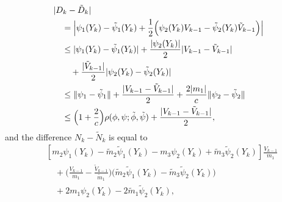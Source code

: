\documentclass[journal]{IEEEtran}
\newcommand{\1}{\boldsymbol{1}}
\begin{document}
  \begin{align*}
    \notag
	&|D_k - \tilde{D}_k|\\%
	&\quad= \Big| \psi_1(Y_k) - \tilde{\psi}_1(Y_k) + \frac{1}{2}\Big(\psi_2(Y_k)V_{k-1} - \tilde{\psi}_2(Y_k)\tilde{V}_{k-1} \Big) \Big|\\
	\notag
	&\quad\leq |\psi_1(Y_k) - \tilde{\psi}_1(Y_k)|%
          + \frac{|\psi_2(Y_k)|}{2}|V_{k-1} - \tilde{V}_{k-1}|\\%
    &\qquad
   + \frac{|\tilde{V}_{k-1}|}{2}|\psi_2(Y_k) - \tilde{\psi}_2(Y_k)|\\
   \notag
	&\quad\leq \|\psi_1 - \tilde{\psi}_1\| + \frac{|V_{k-1} - \tilde{V}_{k-1}|}{2}%
   + \frac{2|m_1|}{c}\|\psi_2 - \tilde{\psi}_2\|\\
	&\quad\leq \Big(1 + \frac{2}{c}\Big)\rho(\phi,\psi;\tilde{\phi},\tilde{\psi})%
   + \frac{|V_{k-1} - \tilde{V}_{k-1}|}{2},
  \end{align*}
  and the difference $N_k - \tilde{N}_k $ is equal to
  \begin{align*}
	& [m_2\psi_1(Y_k) - \tilde{m}_2\tilde{\psi}_1(Y_k) - m_3\psi_2(Y_k) + \tilde{m}_3\tilde{\psi}_2(Y_k)] \frac{V_{k-1}}{m_1}\\
	&\quad%
          + \Big(\frac{V_{k-1}}{m_1} - \frac{\tilde{V}_{k-1}}{\tilde{m}_1} \Big)\Big(\tilde{m}_2\tilde{\psi}_1(Y_k) - \tilde{m}_3\tilde{\psi}_2(Y_k)  \Big)\\%
    &\quad
   + 2m_1\psi_2(Y_k) - 2\tilde{m}_1 \tilde{\psi}_2(Y_k),
  \end{align*}
\end{document}

